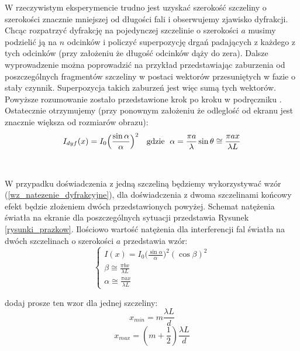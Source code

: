 \documentclass{article}
\begin{document}
W rzeczywistym eksperymencie trudno jest uzyskać szerokość szczeliny o szerokości znacznie mniejszej od długości fali i obserwujemy zjawisko dyfrakcji. Chcąc rozpatrzyć dyfrakcję na pojedynczej szczelinie o szerokości $a$ musimy podzielić ją na $n$ odcinków i policzyć superpozycję drgań padających z każdego z tych odcinków (przy założeniu że długość odcinków dąży do zera). Dalsze wyprowadzenie można poprowadzić na przykład przedstawiając zaburzenia od poszczególnych fragmentów szczeliny w postaci wektorów przesuniętych w fazie o stały czynnik. Superpozycja takich zaburzeń jest więc sumą tych wektorów. Powyższe rozumowanie zostało przedstawione krok po kroku w podręczniku \cite{5}. Ostatecznie otrzymujemy (przy ponownym założeniu że odleglość od ekranu jest znacznie większa od rozmiarów obrazu)\cite{1}:
\begin{equation}
I_{dyf}(x) = I_0\Big(\frac{\sin \alpha}{\alpha}\Big)^2\text{  \hspace{0.1cm}  gdzie   \hspace{0.1cm}} \alpha=\frac{\pi a}{\lambda}\sin\theta \cong \frac{\pi a x}{\lambda L}
\label{wz_natezenie_dyfrakcyjne}
\end{equation}\\\\

W przypadku doświadczenia z jedną szczeliną będziemy wykorzystywać wzór (\ref{wz_natezenie_dyfrakcyjne}), dla doświadczenia z dwoma szczelinami końcowy efekt będzie złożeniem dwóch przedstawionych powyżej. Schemat natężenia światła na ekranie dla poszczególnych sytuacji przedstawia Rysunek \ref{rysunki_prazkow}. Ilościowo wartość natężenia dla interferencji fal światła na dwóch szczelinach o szerokości $a$ przedstawia wzór:
\begin{equation}
\begin{cases}
I(x) = I_0\Big(\frac{\sin \alpha}{\alpha}\Big)^2(\cos \beta)^2   \\
\beta \cong \frac{\pi b x}{\lambda L}\\
\alpha \cong \frac{\pi a x}{\lambda L}
\end{cases}
\end{equation}

dodaj prosze ten wzor dla jednej szczeliny:
\begin{equation}
	\label{pozycja_maks_jedna_szczelina_min}
	x_{min} = m\frac{\lambda L}{d}
\end{equation}
\begin{equation}
	\label{pozycja_maks_jedna_szczelina_max}
	x_{max} = (m+\frac{1}{2})\frac{\lambda L}{d}
\end{equation}
\end{document}
